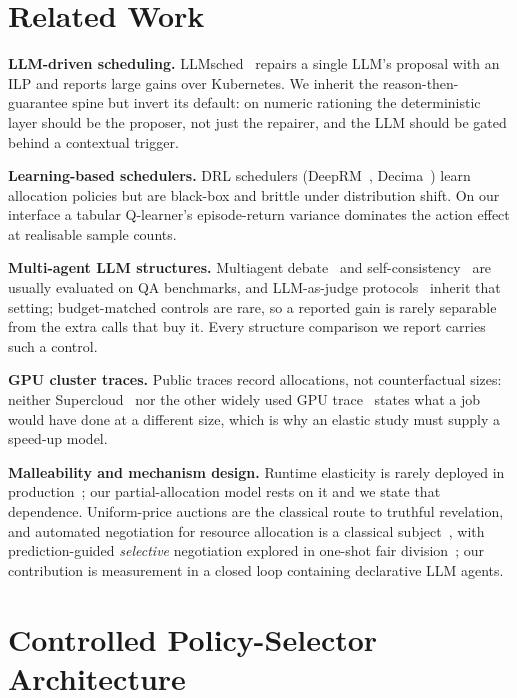 \documentclass[conference]{IEEEtran}
\begin{document}
\section{Related Work}
\label{sec:related}

\textbf{LLM-driven scheduling.} LLMsched~\cite{llmsched} repairs a single LLM's proposal with
an ILP and reports large gains over Kubernetes. We inherit the reason-then-guarantee spine but
invert its default: on numeric rationing the deterministic layer should be the proposer, not
just the repairer, and the LLM should be gated behind a contextual trigger.

\textbf{Learning-based schedulers.} DRL schedulers (DeepRM~\cite{deeprm},
Decima~\cite{decima}) learn allocation policies but are black-box and brittle under
distribution shift. On our interface a tabular Q-learner's episode-return variance dominates
the action effect at realisable sample counts.

\textbf{Multi-agent LLM structures.} Multiagent debate~\cite{du2024debate} and
self-consistency~\cite{wang2023selfconsistency} are usually evaluated on QA benchmarks, and
LLM-as-judge protocols~\cite{zheng2023judge} inherit that setting; budget-matched controls are
rare, so a reported gain is rarely separable from the extra calls that buy it. Every structure
comparison we report carries such a control.

\textbf{GPU cluster traces.} Public traces record allocations, not counterfactual sizes: neither
Supercloud~\cite{supercloud} nor the other widely used GPU trace~\cite{alibaba2020} states what a job
would have done at a different size, which is why an elastic study must supply a speed-up model.

\textbf{Malleability and mechanism design.} Runtime elasticity is rarely deployed in
production~\cite{tarraf2024}; our partial-allocation model rests on it and we state that
dependence. Uniform-price auctions are the classical route to truthful revelation, and
automated negotiation for resource allocation is a classical subject~\cite{boan2011}, with
prediction-guided \emph{selective} negotiation explored in one-shot fair
division~\cite{croitoru2025}; our contribution is measurement in a closed loop containing
declarative LLM agents.

\section{Controlled Policy-Selector Architecture}
\label{sec:arch}
\end{document}
